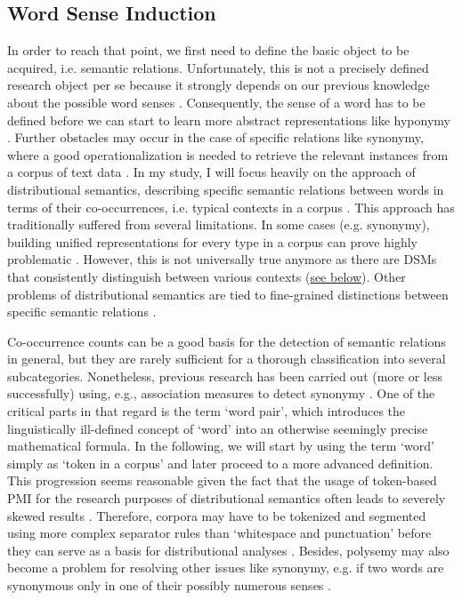 \documentclass[runningheads]{llncs}
\begin{document}
\subsection{Word Sense Induction}
\label{polysemyProblemForSemanticRelations}
In order to reach that point, we first need to define the basic object to be acquired, i.e. semantic relations. Unfortunately, this is not a precisely defined research object per se because it strongly depends on our previous knowledge about the possible word senses \parencite[12]{ayseExtractionSemanticWord2011}. Consequently, the sense of a word has to be defined before we can start to learn more abstract representations like hyponymy \parencite[137]{bartunovBreakingSticksAmbiguities2016}. Further obstacles may occur in the case of specific relations like synonymy, where a good operationalization is needed to retrieve the relevant instances from a corpus of text data \parencite[274]{divjakCorpusbasedCognitiveSemantics2009}. In my study, I will focus heavily on the approach of distributional semantics, describing specific semantic relations between words in terms of their co-occurrences, i.e. typical contexts in a corpus \parencites[162]{harrisDistributionalStructure1954}[30]{firthSynopsisLinguisticTheory1957}. This approach has traditionally suffered from several limitations. In some cases (e.g. synonymy), building unified representations for every type in a corpus can prove highly problematic \parencite[114]{karanDistributionalSemanticsApproach2012}. However, this is not universally true anymore as there are \gls{DSM}s that consistently distinguish between various contexts (\hyperlink{ELMO}{see below}). Other problems of distributional semantics are tied to fine-grained distinctions between specific semantic relations \parencite[115]{karanDistributionalSemanticsApproach2012}.

Co-occurrence counts can be a good basis for the detection of semantic relations in general, but they are rarely sufficient for a thorough classification into several subcategories. Nonetheless, previous research has been carried out (more or less successfully) using, e.g., association measures to detect synonymy \parencite[566]{hagiwaraSupervisedSynonymAcquisition2009}. One of the critical parts in that regard is the term `word pair', which introduces the linguistically ill-defined concept of `word' into an otherwise seemingly precise mathematical formula. In the following, we will start by using the term `word' simply as `token in a corpus' and later proceed to a more advanced definition. This progression seems reasonable given the fact that the usage of token-based \gls{PMI} for the research purposes of distributional semantics often leads to severely skewed results \parencite[444]{herbelotMeasuringSemanticContent2013}. Therefore, corpora may have to be tokenized and segmented using more complex separator rules than `whitespace and punctuation' before they can serve as a basis for distributional analyses \parencite[6]{mikolovDistributedRepresentationsWords2013}. Besides, polysemy may also become a problem for resolving other issues like synonymy, e.g. if two words are synonymous only in one of their possibly numerous senses \parencite[444]{herbelotMeasuringSemanticContent2013}. 
\end{document}
